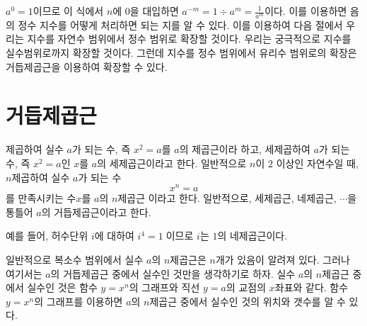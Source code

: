 \documentclass[11pt, a4paper]{book}
\begin{document}
$a^{0}=1$이므로 이 식에서 $n$에 $0$을 대입하면 $a^{-m}=1 \div a^m = \frac{1}{a^m}$이다. 이를 이용하면 음의 정수 지수를 어떻게 처리하면 되는 지를 알 수 있다. 이를 이용하여 다음 절에서 우리는 지수를 자연수 범위에서 정수 범위로 확장할 것이다. 우리는 궁극적으로 지수를 실수범위로까지 확장할 것이다. 그런데 지수를 정수 범위에서 유리수 범위로의 확장은 거듭제곱근을 이용하여 확장할 수 있다.
  
 	\section{거듭제곱근}
제곱하여 실수 $a$가 되는 수, 즉 $x^2 =a$를 $a$의 제곱근이라 하고, 세제곱하여 $a$가 되는 수, 즉  $x^2 =a$인 $x$를 $a$의 세제곱근이라고 한다. 일반적으로 $n$이 $2$ 이상인 자연수일 때, $n$제곱하여 실수 $a$가 되는 수
$$x^n =a$$
를 만족시키는 수$x$를 $a$의 {\color{red}$n$제곱근} 이라고 한다. 일반적으로, 세제곱근, 네제곱근, $\cdots$을 통틀어 $a$의 {\color{red}거듭제곱근}이라고 한다.

예를 들어, 허수단위 $i$에 대하여 $i^4 =1$이므로 $i$는 $1$의 네제곱근이다.

 일반적으로 복소수 범위에서 실수 $a$의 $n$제곱근은 $n$개가 있음이 알려져 있다. 그러나 여기서는 $a$의 거듭제곱근 중에서 실수인 것만을 생각하기로 하자. 실수 $a$의 $n$제곱근 중에서 실수인 것은 함수 $y = x^n$의 그래프와 직선 $y=a$의 교점의 $x$좌표와 같다. 함수 $y = x^n$의 그래프를 이용하면 $a$의 $n$제곱근 중에서 실수인 것의 위치와 갯수를 알 수 있다.
 
\end{document}
